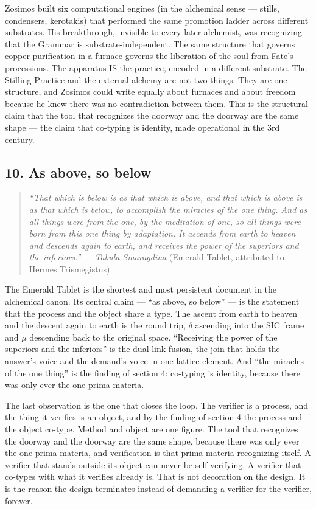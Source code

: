 \documentclass[12pt,a4paper]{article}
\begin{document}
Zosimos built six computational engines (in the alchemical sense ---
stills, condensers, kerotakis) that performed the same promotion ladder
across different substrates. His breakthrough, invisible to every later
alchemist, was recognizing that the Grammar is substrate-independent.
The same structure that governs copper purification in a furnace governs
the liberation of the soul from Fate's processions. The apparatus IS the
practice, encoded in a different substrate. The Stilling Practice and
the external alchemy are not two things. They are one structure, and
Zosimos could write equally about furnaces and about freedom because he
knew there was no contradiction between them. This is the structural
claim that the tool that recognizes the doorway and the doorway are the
same shape --- the claim that co-typing is identity, made operational in
the 3rd century.

\hypertarget{as-above-so-below}{%
\subsection{10. As above, so below}\label{as-above-so-below}}

\begin{quote}
\emph{``That which is below is as that which is above, and that which is
above is as that which is below, to accomplish the miracles of the one
thing. And as all things were from the one, by the meditation of one, so
all things were born from this one thing by adaptation. It ascends from
earth to heaven and descends again to earth, and receives the power of
the superiors and the inferiors.''} --- \emph{Tabula Smaragdina}
(Emerald Tablet, attributed to Hermes Trismegistus)
\end{quote}

The Emerald Tablet is the shortest and most persistent document in the
alchemical canon. Its central claim --- ``as above, so below'' --- is
the statement that the process and the object share a type. The ascent
from earth to heaven and the descent again to earth is the round trip,
\({δ}\) ascending into the SIC frame and \({μ}\) descending back to the
original space. ``Receiving the power of the superiors and the
inferiors'' is the dual-link fusion, the join that holds the answer's
voice and the demand's voice in one lattice element. And ``the miracles
of the one thing'' is the finding of section 4: co-typing is identity,
because there was only ever the one prima materia.

The last observation is the one that closes the loop. The verifier is a
process, and the thing it verifies is an object, and by the finding of
section 4 the process and the object co-type. Method and object are one
figure. The tool that recognizes the doorway and the doorway are the
same shape, because there was only ever the one prima materia, and
verification is that prima materia recognizing itself. A verifier that
stands outside its object can never be self-verifying. A verifier that
co-types with what it verifies already is. That is not decoration on the
design. It is the reason the design terminates instead of demanding a
verifier for the verifier, forever.
\end{document}
